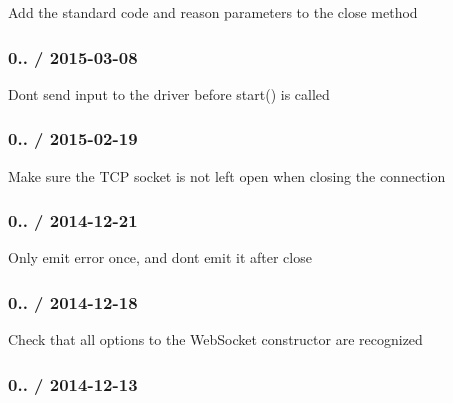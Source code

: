 
\begin{DoxyItemize}
\item Add the standard {\ttfamily code} and {\ttfamily reason} parameters to the {\ttfamily close} method
\end{DoxyItemize}

\subsubsection*{0.. / 2015-\/03-\/08}


\begin{DoxyItemize}
\item Don\textquotesingle{}t send input to the driver before {\ttfamily start()} is called
\end{DoxyItemize}

\subsubsection*{0.. / 2015-\/02-\/19}


\begin{DoxyItemize}
\item Make sure the T\+CP socket is not left open when closing the connection
\end{DoxyItemize}

\subsubsection*{0.. / 2014-\/12-\/21}


\begin{DoxyItemize}
\item Only emit {\ttfamily error} once, and don\textquotesingle{}t emit it after {\ttfamily close}
\end{DoxyItemize}

\subsubsection*{0.. / 2014-\/12-\/18}


\begin{DoxyItemize}
\item Check that all options to the Web\+Socket constructor are recognized
\end{DoxyItemize}

\subsubsection*{0.. / 2014-\/12-\/13}


